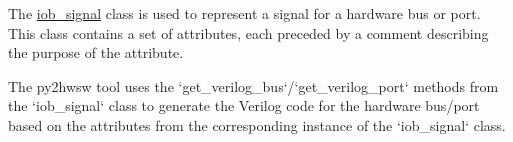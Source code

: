 %

%
%

The \href{https://github.com/IObundle/py2hwsw/blob/main/py2hwsw/scripts/iob_signal.py}{iob\_signal} class is used to represent a signal for a hardware bus or port.
This class contains a set of attributes, each preceded by a comment describing the purpose of the attribute.


%
%

The py2hwsw tool uses the `get\_verilog\_bus`/`get\_verilog\_port` methods from the `iob\_signal` class to generate the Verilog code for the hardware bus/port based on the attributes from the corresponding instance of the `iob\_signal` class.


